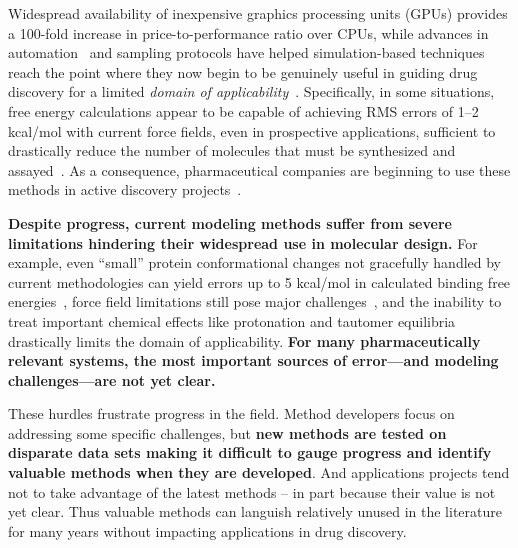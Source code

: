 \documentclass[11pt]{article}
\begin{document}
Widespread availability of inexpensive graphics processing units (GPUs) provides a 100-fold increase in price-to-performance ratio over CPUs, while advances in automation~\cite{liu_lead_2013} and sampling protocols have helped simulation-based techniques reach the point where they now begin to be genuinely useful in guiding drug discovery for a limited \emph{domain of applicability}~\cite{mikulskis_large-scale_2014, homeyer_binding_2014, Sherborne:2016:JComputAidedMolDes,  schrodinger_accurate_2015, christ_binding_2016, cui_affinity_2016, verras_free_2016}.
Specifically, in some situations, free energy calculations appear to be capable of achieving RMS errors of 1--2 kcal/mol with current force fields, even in prospective applications, sufficient to drastically reduce the number of molecules that must be synthesized and assayed~\cite{shirts_free-energy_2010, Aldeghi:2017:J.Am.Chem.Soc., schrodinger_accurate_2015}.
As a consequence, pharmaceutical companies are beginning to use these methods in active discovery projects~\cite{Sherborne:2016:JComputAidedMolDes}.

\textbf{Despite progress, current modeling methods suffer from severe limitations hindering their widespread use in molecular design.}
For example, even ``small'' protein conformational changes not gracefully handled by current methodologies can yield errors up to 5 kcal/mol in calculated binding free energies~\cite{lim_sensitivity_2016}, force field limitations still pose major challenges~\cite{rocklin_blind_2013}, and the inability to treat important chemical effects like protonation and tautomer equilibria drastically limits the domain of applicability.
{\bf For many pharmaceutically relevant systems, the most important sources of error---and modeling challenges---are not yet clear.~\cite{Sherborne:2016:JComputAidedMolDes}}

These hurdles frustrate progress in the field. 
Method developers focus on addressing some specific challenges, but {\bf new methods are tested on disparate data sets making it difficult to gauge progress and identify valuable methods when they are developed}.
And applications projects tend not to take advantage of the latest methods -- in part because their value is not yet clear. 
Thus valuable methods can languish relatively unused in the literature for many years without impacting applications in drug discovery.
\end{document}

